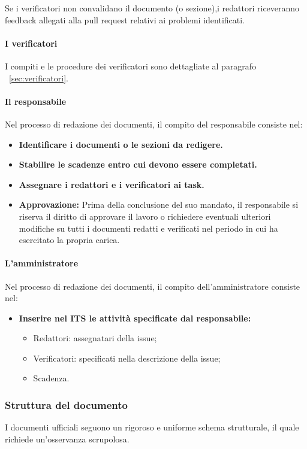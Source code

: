 \documentclass{article}
\begin{document}
    
   Se i verificatori non convalidano il documento (o sezione),i redattori riceveranno feedback allegati alla pull request relativi ai problemi identificati.
   \paragraph{I verificatori}
   I compiti e le procedure dei verificatori sono dettagliate al paragrafo ~\ref{sec:verificatori}. 
    \paragraph{Il responsabile}
    Nel processo di redazione dei documenti, il compito del responsabile consiste nel: 
        \begin{itemize}
        \item \textbf{Identificare i documenti o le sezioni da redigere. }
        \item \textbf{Stabilire le scadenze entro cui devono essere completati.}
        \item \textbf{Assegnare i redattori e i verificatori ai task.}
        \item \textbf{Approvazione:} Prima della conclusione del suo mandato, il responsabile si riserva il diritto di approvare il lavoro o richiedere eventuali ulteriori modifiche su tutti i documenti redatti e verificati nel periodo in cui ha esercitato la propria carica.
    \end{itemize}
  
    \paragraph{L'amministratore}
     Nel processo di redazione dei documenti, il compito dell'amministratore consiste nel: 
        \begin{itemize}
        \item \textbf{Inserire nel ITS le attività specificate dal responsabile:} \begin{itemize}
            \item Redattori: assegnatari della issue;
            \item Verificatori: specificati nella descrizione della issue;
            \item Scadenza.
        \end{itemize}
    \end{itemize}
    \subsubsection{Struttura del documento}
I documenti ufficiali seguono un rigoroso e uniforme schema strutturale, il quale richiede un'osservanza scrupolosa.
\end{document}
